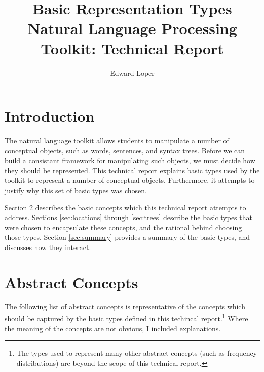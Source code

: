 \documentclass[11pt]{article}
\begin{document}
\title{Basic Representation Types\\
\Large Natural Language Processing Toolkit: Technical Report}
\author{Edward Loper}
\maketitle

\section{Introduction}

  The natural language toolkit allows students to manipulate a number
  of conceptual objects, such as words, sentences, and syntax trees.
  Before we can build a consistant framework for manipulating such
  objects, we must decide how they should be represented.  This
  technical report explains basic types used by the toolkit to
  represent a number of conceptual objects.  Furthermore, it attempts
  to justify why this set of basic types was chosen.

  Section \ref{sec:concepts} describes the basic concepts which this
  technical report attempts to address.  Sections \ref{sec:locations}
  through \ref{sec:trees} describe the basic types that were chosen to
  encapsulate these concepts, and the rational behind choosing those
  types.  Section \ref{sec:summary} provides a summary of the basic
  types, and discusses how they interact.

\newpage
\section{Abstract Concepts}
\label{sec:concepts}

  The following list of abstract concepts is representative of the
  concepts which should be captured by the basic types defined in this
  techincal report.\footnote{The types used to represent many other
  abstract concepts (such as frequency distributions) are beyond the
  scope of this technical report.}  Where the meaning of the concepts
  are not obvious, I included explanations.
\end{document}
